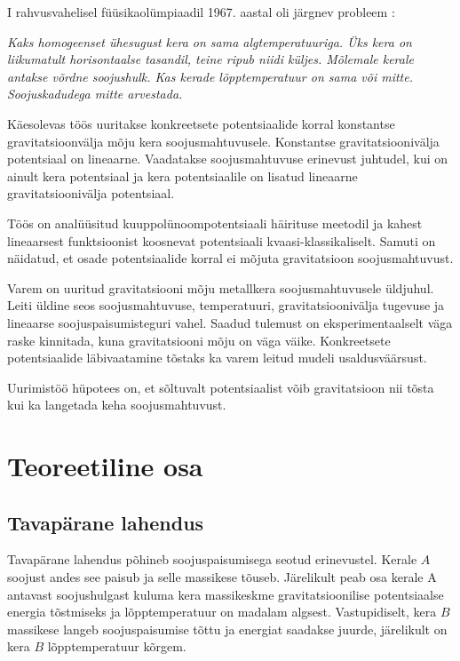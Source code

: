 \documentclass{trkut}%
\begin{document}
\maketitle%
\tableofcontents%
\nummerdame%
I rahvusvahelisel füüsikaolümpiaadil 1967. aastal oli järgnev probleem \cite{ipho67}:

\textit{Kaks homogeenset ühesugust kera on sama algtemperatuuriga. Üks kera on liikumatult horisontaalse tasandil, teine ripub niidi küljes. Mõlemale kerale antakse võrdne soojushulk. Kas kerade lõpptemperatuur on sama või mitte. Soojuskadudega mitte arvestada.}

Käesolevas töös uuritakse konkreetsete potentsiaalide korral konstantse gravitatsioonvälja mõju kera soojusmahtuvusele. Konstantse gravitatsioonivälja potentsiaal on lineaarne. Vaadatakse soojusmahtuvuse erinevust juhtudel, kui on ainult kera potentsiaal ja kera potentsiaalile on lisatud lineaarne gravitatsioonivälja potentsiaal. 

Töös on analüüsitud kuuppolünoompotentsiaali häirituse meetodil ja kahest lineaarsest funktsioonist koosnevat potentsiaali kvaasi-klassikaliselt. Samuti on näidatud, et osade potentsiaalide korral ei mõjuta gravitatsioon soojusmahtuvust.

Varem on uuritud gravitatsiooni mõju metallkera soojusmahtuvusele üldjuhul. Leiti üldine seos soojusmahtuvuse, temperatuuri, gravitatsioonivälja tugevuse ja lineaarse soojuspaisumisteguri vahel. Saadud tulemust on eksperimentaalselt väga raske kinnitada, kuna gravitatsiooni mõju on väga väike. Konkreetsete potentsiaalide läbivaatamine tõstaks ka varem leitud mudeli usaldusväärsust.

Uurimistöö hüpotees on, et sõltuvalt potentsiaalist võib gravitatsioon nii tõsta kui ka langetada keha soojusmahtuvust.

\chapter{Teoreetiline osa}

\section{Tavapärane lahendus}

Tavapärane lahendus põhineb soojuspaisumisega seotud erinevustel. Kerale $A$ soojust andes see paisub ja selle massikese tõuseb. Järelikult peab osa kerale A antavast soojushulgast kuluma kera massikeskme gravitatsioonilise potentsiaalse energia tõstmiseks ja lõpptemperatuur on madalam algsest. Vastupidiselt, kera $B$ massikese langeb soojuspaisumise tõttu ja energiat saadakse juurde, järelikult on kera $B$ lõpptemperatuur kõrgem. 
\end{document}

